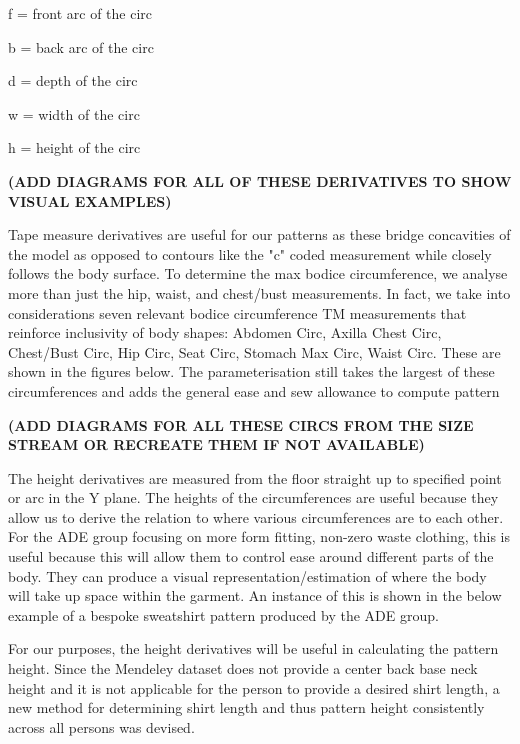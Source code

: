 f = front arc of the circ

b = back arc of the circ

d = depth of the circ

w = width of the circ

h = height of the circ

\textbf{(ADD DIAGRAMS FOR ALL OF THESE DERIVATIVES TO SHOW VISUAL EXAMPLES)}

Tape measure derivatives are useful for our patterns as these bridge concavities of the model as opposed to contours like the "c" coded measurement while closely follows the body surface. To determine the max bodice circumference, we analyse more than just the hip, waist, and chest/bust measurements. In fact, we take into considerations seven relevant bodice circumference TM measurements that reinforce inclusivity of body shapes: Abdomen Circ, Axilla Chest Circ, Chest/Bust Circ, Hip Circ, Seat Circ, Stomach Max Circ, Waist Circ. These are shown in the figures below. The parameterisation still takes the largest of these circumferences and adds the general ease and sew allowance to compute pattern 

\textbf{(ADD DIAGRAMS FOR ALL THESE CIRCS FROM THE SIZE STREAM OR RECREATE THEM IF NOT AVAILABLE)}

The height derivatives are measured from the floor straight up to specified point or arc in the Y plane. The heights of the circumferences are useful because they allow us to derive the relation to where various circumferences are to each other. For the ADE group focusing on more form fitting, non-zero waste clothing, this is useful because this will allow them to control ease around different parts of the body. They can produce a visual representation/estimation of where the body will take up space within the garment. An instance of this is shown in the below example of a bespoke sweatshirt pattern produced by the ADE group. 

For our purposes, the height derivatives will be useful in calculating the pattern height. Since the Mendeley dataset does not provide a center back base neck height and it is not applicable for the person to provide a desired shirt length, a new method for determining shirt length and thus pattern height consistently across all persons was devised.

